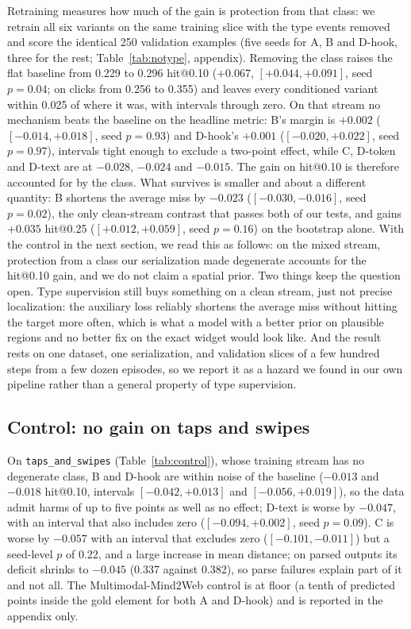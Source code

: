 \documentclass{article}
\makeatletter
\newcommand{\hitat}[1]{hit@#1}
\newcommand{\mix}[1]{\texttt{#1}}
\makeatother
\begin{document}
Retraining measures how much of the gain is protection from that class: we retrain all six variants on the same training slice with the type events removed and score the identical 250 validation examples (five seeds for A, B and D-hook, three for the rest; Table~\ref{tab:notype}, appendix). Removing the class raises the flat baseline from 0.229 to 0.296 \hitat{0.10} ($+0.067$, $[+0.044, +0.091]$, seed $p = 0.04$; on clicks from 0.256 to 0.355) and leaves every conditioned variant within 0.025 of where it was, with intervals through zero. On that stream no mechanism beats the baseline on the headline metric: B's margin is $+0.002$ ($[-0.014, +0.018]$, seed $p = 0.93$) and D-hook's $+0.001$ ($[-0.020, +0.022]$, seed $p = 0.97$), intervals tight enough to exclude a two-point effect, while C, D-token and D-text are at $-0.028$, $-0.024$ and $-0.015$. The gain on \hitat{0.10} is therefore accounted for by the class. What survives is smaller and about a different quantity: B shortens the average miss by $-0.023$ ($[-0.030, -0.016]$, seed $p = 0.02$), the only clean-stream contrast that passes both of our tests, and gains $+0.035$ \hitat{0.25} ($[+0.012, +0.059]$, seed $p = 0.16$) on the bootstrap alone. With the control in the next section, we read this as follows: on the mixed stream, protection from a class our serialization made degenerate accounts for the \hitat{0.10} gain, and we do not claim a spatial prior. Two things keep the question open. Type supervision still buys something on a clean stream, just not precise localization: the auxiliary loss reliably shortens the average miss without hitting the target more often, which is what a model with a better prior on plausible regions and no better fix on the exact widget would look like. And the result rests on one dataset, one serialization, and validation slices of a few hundred steps from a few dozen episodes, so we report it as a hazard we found in our own pipeline rather than a general property of type supervision.

\subsection{Control: no gain on taps and swipes}



On \mix{taps\_and\_swipes} (Table~\ref{tab:control}), whose training stream has no degenerate class, B and D-hook are within noise of the baseline ($-0.013$ and $-0.018$ \hitat{0.10}, intervals $[-0.042, +0.013]$ and $[-0.056, +0.019]$), so the data admit harms of up to five points as well as no effect; D-text is worse by $-0.047$, with an interval that also includes zero ($[-0.094, +0.002]$, seed $p = 0.09$). C is worse by $-0.057$ with an interval that excludes zero ($[-0.101, -0.011]$) but a seed-level $p$ of 0.22, and a large increase in mean distance; on parsed outputs its deficit shrinks to $-0.045$ (0.337 against 0.382), so parse failures explain part of it and not all. The Multimodal-Mind2Web control is at floor (a tenth of predicted points inside the gold element for both A and D-hook) and is reported in the appendix only.
\end{document}
